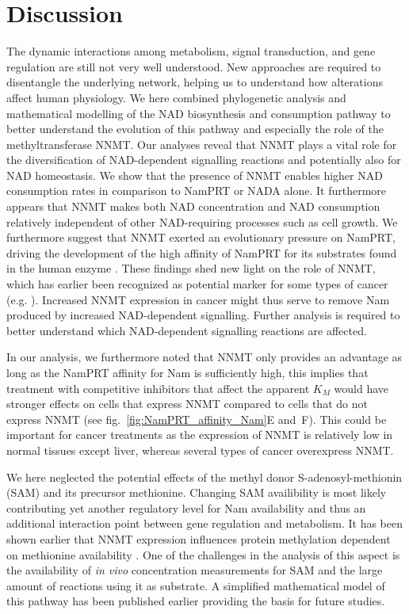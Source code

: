 
\section{Discussion}

The dynamic interactions among metabolism, signal transduction, and gene regulation are still not very well understood. New approaches are required to disentangle the underlying network, helping us to understand how alterations affect human physiology. We here combined phylogenetic analysis and mathematical modelling of the NAD biosynthesis and consumption pathway to better understand the evolution of this pathway and especially the role of the methyltransferase NNMT. Our analyses reveal that NNMT plays a vital role for the diversification of NAD-dependent signalling reactions and potentially also for NAD homeostasis. We show that the presence of NNMT enables higher NAD consumption rates in comparison to NamPRT or NADA alone. It furthermore appears that NNMT makes both NAD concentration and NAD consumption relatively independent of other NAD-requiring processes such as cell growth. We furthermore suggest that NNMT exerted an evolutionary pressure on NamPRT, driving the development of the high affinity of NamPRT for its substrates found in the human enzyme \cite{Burgos2008}. These findings shed new light on the role of NNMT, which has earlier been recognized as potential marker for some types of cancer (e.g. \cite{Okamura1998}). Increased NNMT expression in cancer might thus serve to remove Nam produced by increased NAD-dependent signalling. Further analysis is required to better understand which NAD-dependent signalling reactions are affected.

In our analysis, we furthermore noted that NNMT only provides an advantage as long as the NamPRT affinity for Nam is sufficiently high, this implies that treatment with competitive inhibitors that affect the apparent $K_{M}$ would have stronger effects on cells that express NNMT compared to cells that do not express NNMT (see fig.~\ref{fig:NamPRT_affinity_Nam}E and~F). This could be important for cancer treatments as the expression of NNMT is relatively low in normal tissues except liver, whereas several types of cancer overexpress NNMT.

We here neglected the potential effects of the methyl donor S-adenosyl-methionin (SAM) and its precursor methionine. Changing SAM availibility is most likely contributing yet another regulatory level for Nam availability and thus an additional interaction point between gene regulation and metabolism. It has been shown earlier that NNMT expression influences protein methylation dependent on methionine availability \cite{Ulanovskaya2013}. One of the challenges in the analysis of this aspect is the availability of \textit{in vivo} concentration measurements for SAM and the large amount of reactions using it as substrate. A simplified mathematical model of this pathway has been published earlier \cite{Reed2004} providing the basis for future studies.

